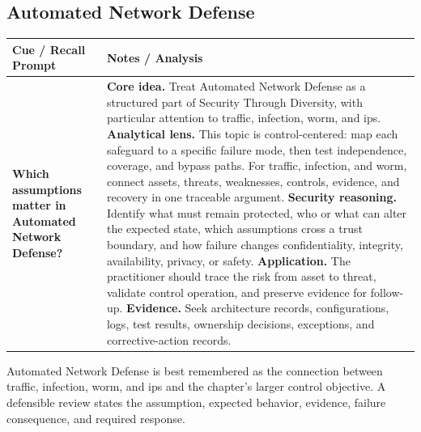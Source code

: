 \documentclass[11pt]{article}
\newcommand{\CornellHeader}{%
\rowcolor{Navy}\color{white}\bfseries Cue / Recall Prompt & \color{white}\bfseries Notes / Analysis\\\hline}
\newcommand{\CornellRow}[2]{%
\cellcolor{CueGray}\RaggedRight\textbf{#1} & \RaggedRight #2\\\hline}
\begin{document}
\subsection*{Automated Network Defense}
\begin{longtable}{>{\RaggedRight\arraybackslash}p{}|>{\RaggedRight\arraybackslash}p{}}
\CornellHeader
\CornellRow{Which assumptions matter in Automated Network Defense?}{\textbf{Core idea.} Treat Automated Network Defense as a structured part of Security Through Diversity, with particular attention to traffic, infection, worm, and ips. \textbf{Analytical lens.} This topic is control-centered: map each safeguard to a specific failure mode, then test independence, coverage, and bypass paths. For traffic, infection, and worm, connect assets, threats, weaknesses, controls, evidence, and recovery in one traceable argument. \textbf{Security reasoning.} Identify what must remain protected, who or what can alter the expected state, which assumptions cross a trust boundary, and how failure changes confidentiality, integrity, availability, privacy, or safety. \textbf{Application.} The practitioner should trace the risk from asset to threat, validate control operation, and preserve evidence for follow-up. \textbf{Evidence.} Seek architecture records, configurations, logs, test results, ownership decisions, exceptions, and corrective-action records.}
\end{longtable}
\begin{topicsummary}
Automated Network Defense is best remembered as the connection between traffic, infection, worm, and ips and the chapter's larger control objective. A defensible review states the assumption, expected behavior, evidence, failure consequence, and required response.
\end{topicsummary}
\end{document}
